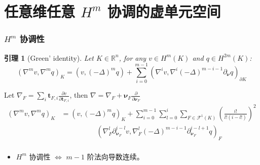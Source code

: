 \documentclass[notheorems,serif]{beamer}
\newcommand{\hei}[1]{{\HEI#1}}
\newtheorem{lemma}{\hei{引理}}
\begin{document}
\section{任意维任意 $H^m$ 协调的虚单元空间}
\begin{frame}
  \frametitle{$H^m$ 协调性}
  \begin{lemma}[Green' identity]
      Let $K\in\mathbb{R}^n$, for any $v \in H^m(K)$ and $q \in H^{2m}(K)$:
      $$
      (\nabla^m v, \nabla^m q)_K = (v, (-\Delta)^m q) + \sum_{i=0}^{m-1}
      (\nabla^i v, \nabla^i(-\Delta)^{m-i-1}\partial_{\boldsymbol{\nu}}q)_{\partial K}
      $$
  \end{lemma}
  Let $\nabla_F  = \sum_{i}\boldsymbol{t}_{F, i}
  \frac{\partial v}{\partial \boldsymbol{t}_{F, i}}$, then $\nabla = \nabla_F +
  \boldsymbol{\nu}_F \frac{\partial }{\partial \boldsymbol{\nu}_F}$
  $$
  \begin{aligned}
  (\nabla^m v, \nabla^m q)_K
  & = (v, (-\Delta)^m q)_K + \sum_{i=0}^{m-1}
     \sum_{l=0}^i\sum_{F\in\mathcal{F}^1(K)}
     \left(\frac{i!}{l!(i-l!)}\right)^2
     \\
     & \quad\quad\quad\quad\quad(\nabla^{l}_{F}\partial^{i-l}_{\boldsymbol\nu_F} v,
     \nabla^{l}_{F}
     (-\Delta)^{m-i-1}\partial^{i-l+1}_{\boldsymbol\nu_F}q)_F\\
  \end{aligned}
  $$
  \begin{itemize}
      \item $H^m$ 协调性 $\Longleftrightarrow$ $m-1$ 阶法向导数连续。
  \end{itemize}
\end{frame}
\end{document}
